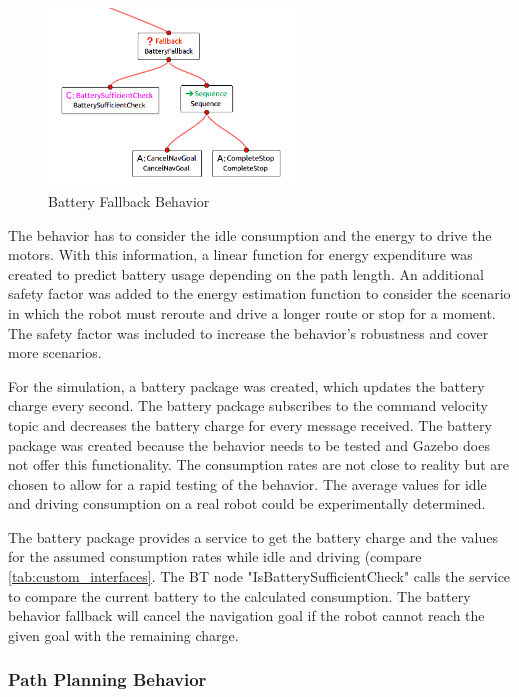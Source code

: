\begin{figure}[ht]
	\centering
	\includegraphics[width=0.6\textwidth]{images/battery_fallback_inverted.png}
	\caption{Battery Fallback Behavior}
	\label{fig:battery_fallback}
\end{figure}

The behavior has to consider the idle consumption and the energy to drive the motors. With this information, a linear function for energy expenditure was created to predict battery usage depending on the path length. An additional safety factor was added to the energy estimation function to consider the scenario in which the robot must reroute and drive a longer route or stop for a moment. The safety factor was included to increase the behavior's robustness and cover more scenarios.
%

For the simulation, a battery package was created, which updates the battery charge every second. The battery package subscribes to the command velocity topic and decreases the battery charge for every message received. The battery package was created because the behavior needs to be tested and Gazebo does not offer this functionality. The consumption rates are not close to reality but are chosen to allow for a rapid testing of the behavior. The average values for idle and driving consumption on a real robot could be experimentally determined. 

The battery package provides a service to get the battery charge and the values for the assumed consumption rates while idle and driving (compare \ref{tab:custom_interfaces}. The BT node "IsBatterySufficientCheck" calls the service to compare the current battery to the calculated consumption. The battery behavior fallback will cancel the navigation goal if the robot cannot reach the given goal with the remaining charge.

\subsubsection{Path Planning Behavior}

